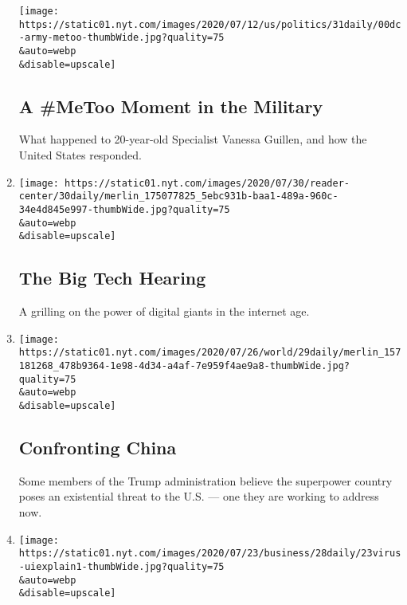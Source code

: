 \begin{enumerate}
  \texttt{[image: https://static01.nyt.com/images/2020/07/12/us/politics/31daily/00dc-army-metoo-thumbWide.jpg?quality=75\\\&auto=webp\\\&disable=upscale]}

  \hypertarget{a-metoo-moment-in-the-military}{%
  \subsection{A \#MeToo Moment in the
  Military}\label{a-metoo-moment-in-the-military}}

  What happened to 20-year-old Specialist Vanessa Guillen, and how the
  United States responded.
\item
  \href{/2020/07/30/podcasts/the-daily/congress-facebook-amazon-google-apple.html}{}

  \texttt{[image: https://static01.nyt.com/images/2020/07/30/reader-center/30daily/merlin\_175077825\_5ebc931b-baa1-489a-960c-34e4d845e997-thumbWide.jpg?quality=75\\\&auto=webp\\\&disable=upscale]}

  \hypertarget{the-big-tech-hearing}{%
  \subsection{The Big Tech Hearing}\label{the-big-tech-hearing}}

  A grilling on the power of digital giants in the internet age.
\item
  \href{/2020/07/29/podcasts/the-daily/china-trump-foreign-policy.html}{}

  \texttt{[image: https://static01.nyt.com/images/2020/07/26/world/29daily/merlin\_157181268\_478b9364-1e98-4d34-a4af-7e959f4ae9a8-thumbWide.jpg?quality=75\\\&auto=webp\\\&disable=upscale]}

  \hypertarget{confronting-china}{%
  \subsection{Confronting China}\label{confronting-china}}

  Some members of the Trump administration believe the superpower
  country poses an existential threat to the U.S. --- one they are
  working to address now.
\item
  \href{/2020/07/28/podcasts/the-daily/unemployment-benefits-coronavirus.html}{}

  \texttt{[image: https://static01.nyt.com/images/2020/07/23/business/28daily/23virus-uiexplain1-thumbWide.jpg?quality=75\\\&auto=webp\\\&disable=upscale]}


\end{enumerate}
